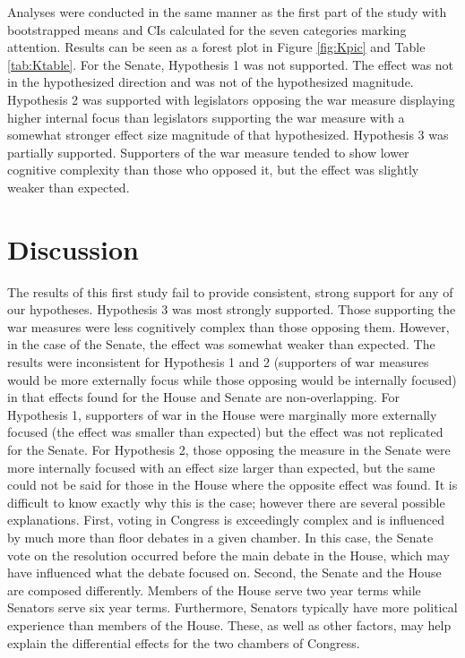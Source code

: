 \documentclass[jou,a4paper]{apa6}
\begin{document}
Analyses were conducted in the same manner as the first part of the study with bootstrapped means and CIs calculated for the seven categories marking attention. Results can be seen as a forest plot in Figure \ref{fig:Kpic} and Table \ref{tab:Ktable}. For the Senate, Hypothesis 1 was not supported. The effect was not in the hypothesized direction and was not of the hypothesized magnitude. Hypothesis 2 was supported with legislators opposing the war measure displaying higher internal focus than legislators supporting the war measure with a somewhat stronger effect size magnitude of that hypothesized. Hypothesis 3 was partially supported. Supporters of the war measure tended to show lower cognitive complexity than those who opposed it, but the effect was slightly weaker than expected.

\section{Discussion}

The results of this first study fail to provide consistent, strong support for any of our hypotheses. Hypothesis 3 was most strongly supported. Those supporting the war measures were less cognitively complex than those opposing them. However, in the case of the Senate, the effect was somewhat weaker than expected. The results were inconsistent for Hypothesis 1 and 2 (supporters of war measures would be more externally focus while those opposing would be internally focused) in that effects found for the House and Senate are non-overlapping. For Hypothesis 1, supporters of war in the House were marginally more externally focused (the effect was smaller than expected) but the effect was not replicated for the Senate. For Hypothesis 2, those opposing the measure in the Senate were more internally focused with an effect size larger than expected, but the same could not be said for those in the House where the opposite effect was found.
It is difficult to know exactly why this is the case; however there are several possible explanations. First, voting in Congress is exceedingly complex and is influenced by much more than floor debates in a given chamber. In this case, the Senate vote on the resolution occurred before the main debate in the House, which may have influenced what the debate focused on. Second, the Senate and the House are composed differently. Members of the House serve two year terms while Senators serve six year terms. Furthermore, Senators typically have more political experience than members of the House. These, as well as other factors, may help explain the differential effects for the two chambers of Congress.
\end{document}
